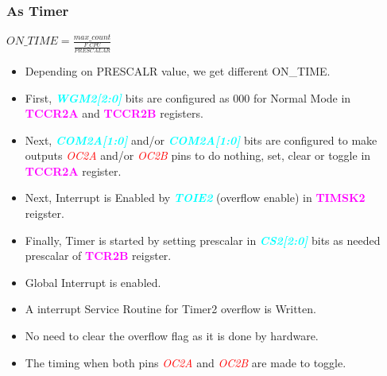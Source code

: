 \documentclass{article}
\newcommand{\bitFormat}[1]{\emph{\textbf{\textcolor{cyan}{#1}}}}
\newcommand{\regFormat}[1]{\textbf{\textcolor{magenta}{#1}}}
\newcommand{\pinFormat}[1]{\emph{\textcolor{red}{#1}}}
\begin{document}
\subsubsection{As Timer}
\begin{center}
    $ON\_TIME = \frac{max\_count}{\frac{F\_CPU}{PRESCALAR}}$
\end{center}
\begin{itemize}
    \item Depending on PRESCALR value, we get different ON\_TIME.
    \item First, \bitFormat{WGM2[2:0]} bits are configured as 000 for Normal Mode in \regFormat{TCCR2A} and \regFormat{TCCR2B} registers.
    \item Next, \bitFormat{COM2A[1:0]} and/or \bitFormat{COM2A[1:0]} bits are configured to make outputs \pinFormat{OC2A} and/or \pinFormat{OC2B} pins to do nothing, set, clear or toggle in \regFormat{TCCR2A} register.
    \item Next, Interrupt is Enabled by \bitFormat{TOIE2} (overflow enable) in \regFormat{TIMSK2} reigster.
    \item Finally, Timer is started by setting prescalar in \bitFormat{CS2[2:0]} bits as needed prescalar of \regFormat{TCR2B} reigster.
    \item Global Interrupt is enabled.
    \item A interrupt Service Routine for Timer2 overflow is Written.
    \item No need to clear the overflow flag as it is done by hardware.
    \item The timing when both pins \pinFormat{OC2A} and \pinFormat{OC2B} are made to toggle.
\end{itemize}
\end{document}
